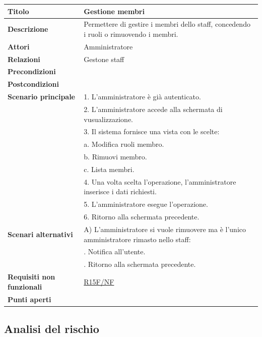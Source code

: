 \documentclass[a4paper]{article}
\begin{document}
\begin{center}
\begin{tabularx}{1\textwidth}{|l|X|}
    \hline
	\textbf{Titolo} & Gestione membri \\
	\hline
	\textbf{Descrizione} & Permettere di gestire i membri dello staff, concedendo i ruoli o rimuovendo i membri. \\
	\hline
	\textbf{Attori} & Amministratore \\
	\hline
	\textbf{Relazioni} & Gestone staff \\
	\hline
	\textbf{Precondizioni} &  \\
	\hline
	\textbf{Postcondizioni} &  \\
	\hline
	\textbf{Scenario principale} & 1. L'amministratore è già autenticato.\\
	                             & 2. L'amministratore accede alla schermata di vusualizzazione. \\
								 & 3. Il sistema fornisce una vista con le scelte: \\
								 & \quad a. Modifica ruoli membro.\\
								 & \quad b. Rimuovi membro.\\
								 & \quad c. Lista membri.\\
								 & 4. Una volta scelta l'operazione, l'amministratore inserisce i dati richiesti. \\
								 & 5. L'amministratore esegue l'operazione.\\
								 & 6. Ritorno alla schermata precedente.\\
	\hline
	\textbf{Scenari alternativi} & A) L'amministratore si vuole rimuovere ma è l'unico amministratore rimasto nello staff: \\
								 & \quad 1. Notifica all'utente. \\
								 & \quad 2. Ritorno alla schermata precedente. \\
	\hline
	\textbf{Requisiti non funzionali} & \hyperlink{R15F/NF}{R15F/NF} \\
	\hline
	\textbf{Punti aperti} & \\
	\hline
\end{tabularx}
\end{center}


\newpage

\subsection{Analisi del rischio}
\end{document}
